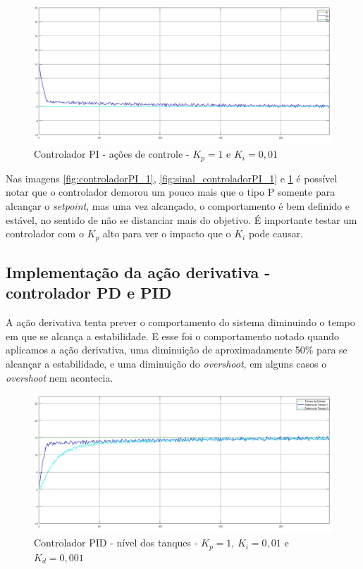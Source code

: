 \documentclass[
	12pt,				%
	openany,			%
	oneside,			%
	a4paper,			%
	english,			%
	french,				%
	spanish,			%
	brazil,				%
	]{abntex2}
\begin{document}
{\begin{figure}[h]
	\centering
	\includegraphics[scale=0.30]{1 - PI acoes_controle.jpg}
	\caption{Controlador PI - ações de controle - $K_p = 1$ e $K_i = 0,01$}
	\label{fig:acao_controladorPI_1}
\end{figure}


\clearpage

Nas imagens \ref{fig:controladorPI_1}, \ref{fig:sinal_controladorPI_1} e \ref{fig:acao_controladorPI_1} é possível notar que o controlador demorou um pouco mais que o tipo P somente para alcançar o \textit{setpoint}, mas uma vez alcançado, o comportamento é bem definido e estável, no sentido de não se distanciar mais do objetivo. É importante testar um controlador com o $K_p$ alto para ver o impacto que o $K_i$ pode causar.

\subsection{Implementação da ação derivativa - controlador PD e PID}

A ação derivativa tenta prever o comportamento do sistema diminuindo o tempo em que se alcança a estabilidade. E esse foi o comportamento notado quando aplicamos a ação derivativa, uma diminuição de aproximadamente 50\% para se alcançar a estabilidade, e uma diminuição do \textit{overshoot}, em alguns casos o \textit{overshoot} nem acontecia.

\begin{figure}[h]
	\centering
	\includegraphics[scale=0.30]{4 - nivel_ PDI_1kp_001ki_0001kd.jpg}
	\caption{Controlador PID - nível dos tanques - $K_p = 1$, $K_i = 0,01$ e $K_d=0,001$}
	\label{fig:controladorPID_1}
\end{figure}

}
\end{document}
